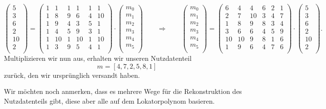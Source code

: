 \[
\begin{pmatrix}
	5 \\ 3 \\ 6 \\ 2 \\ 10 \\ 2 \\
\end{pmatrix}
=
\begin{pmatrix}
	1&  1& 1&  1& 1&  1\\
	1&  8& 9&  6& 4& 10\\
	1&  9& 4&  3& 5&  1\\
	1&  4& 5&  9& 3&  1\\
	1& 10& 1& 10& 1& 10\\
	1&  3& 9&  5& 4&  1\\
\end{pmatrix}
\cdot
\begin{pmatrix}
	m_0 \\ m_1 \\ m_2 \\ m_3 \\ m_4 \\ m_5 \\
\end{pmatrix}
\qquad
\Rightarrow
\qquad
\begin{pmatrix}
	m_0 \\ m_1 \\ m_2 \\ m_3 \\ m_4 \\ m_5 \\
\end{pmatrix}
=
\begin{pmatrix}
	6&  4&  4&  6& 2&  1\\
	2&  7& 10&  3& 4&  7\\
	1&  8&  9&  8& 3&  4\\
	3&  6&  6&  4& 5&  9\\
	10& 10&  9&  8& 1&  6\\
	1&  9&  6&  4& 7&  6\\
\end{pmatrix}
\cdot
\begin{pmatrix}
	5 \\ 3 \\ 6 \\ 2 \\ 10 \\ 2 \\
\end{pmatrix}.
\]
Multiplizieren wir nun aus, erhalten wir unseren Nutzdatenteil
\[
m = [4,7,2,5,8,1]
\]
zurück, den wir ursprünglich versandt haben.

Wir möchten noch anmerken, dass es mehrere Wege für die Rekonstruktion des Nutzdatenteils gibt, diese aber alle auf dem Lokatorpolynom basieren. 

